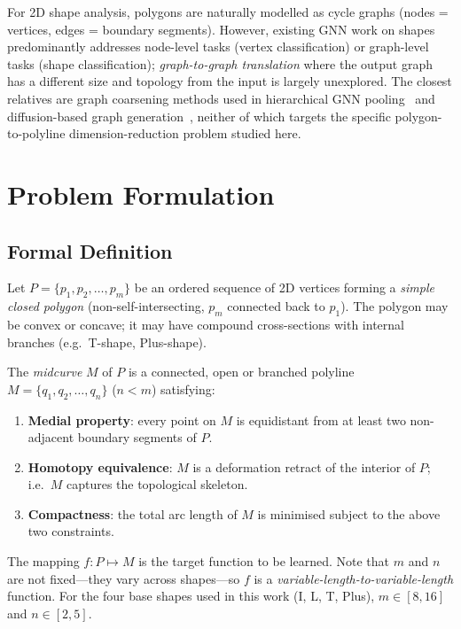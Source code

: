 \documentclass[journal]{IEEEtran}
\begin{document}
For 2D shape analysis, polygons are naturally modelled as cycle graphs (nodes =
vertices, edges = boundary segments).  However, existing GNN work on shapes
predominantly addresses node-level tasks (vertex classification) or graph-level
tasks (shape classification); \emph{graph-to-graph translation} where the
output graph has a different size and topology from the input is largely
unexplored.  The closest relatives are graph coarsening methods used in
hierarchical GNN pooling~\cite{ying2018hierarchical} and diffusion-based graph
generation~\cite{jo2022score}, neither of which targets the specific
polygon-to-polyline dimension-reduction problem studied here.

\section{Problem Formulation}
\label{sec:problem}

\subsection{Formal Definition}

Let $P = \{p_1, p_2, \ldots, p_m\}$ be an ordered sequence of 2D vertices
forming a \emph{simple closed polygon} (non-self-intersecting, $p_m$
connected back to $p_1$).  The polygon may be convex or concave; it may have
compound cross-sections with internal branches (e.g.\ T-shape, Plus-shape).

The \emph{midcurve} $M$ of $P$ is a connected, open or branched polyline
$M = \{q_1, q_2, \ldots, q_n\}$ ($n < m$) satisfying:
\begin{enumerate}
  \item \textbf{Medial property}: every point on $M$ is equidistant from at
        least two non-adjacent boundary segments of $P$.
  \item \textbf{Homotopy equivalence}: $M$ is a deformation retract of the
        interior of $P$; i.e.\ $M$ captures the topological skeleton.
  \item \textbf{Compactness}: the total arc length of $M$ is minimised subject
        to the above two constraints.
\end{enumerate}

The mapping $f: P \mapsto M$ is the target function to be learned.  Note that
$m$ and $n$ are not fixed—they vary across shapes—so $f$ is a
\emph{variable-length-to-variable-length} function.  For the four base shapes
used in this work (I, L, T, Plus), $m \in [8, 16]$ and $n \in [2, 5]$.
\end{document}
